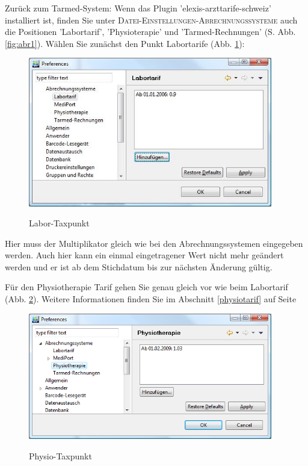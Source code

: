 \documentclass[a4paper]{scrartcl}
\begin{document}
Zurück zum Tarmed-System: Wenn das Plugin 'elexis-arzttarife-schweiz' installiert ist, finden Sie unter \textsc{Datei-Einstellungen-Abrechnungssysteme} auch die Positionen 'Labortarif', 'Physioterapie' und 'Tarmed-Rechnungen' (S. Abb. \ref{fig:abr1}). Wählen Sie zunächst den Punkt Labortarife (Abb. \ref{fig:abr3}):
\begin{figure}
  \includegraphics[width=0.95\textwidth]{abr3}\\
  \caption{Labor-Taxpunkt}\label{fig:abr3}
\end{figure}
Hier muss der Multiplikator gleich wie bei den Abrechnungssystemen eingegeben werden. Auch hier kann ein einmal eingetragener Wert nicht mehr geändert werden und er ist ab dem Stichdatum bis zur nächsten Änderung gültig.

\medskip

Für den Physiotherapie Tarif gehen Sie genau gleich vor wie beim Labortarif (Abb. \ref{fig:abr24}). Weitere Informationen finden Sie im Abschnitt \ref{physiotarif} auf Seite \pageref{physiotarif}
\begin{figure}
  \includegraphics[width=0.95\textwidth]{abr24}\\
  \caption{Physio-Taxpunkt}\label{fig:abr24}
\end{figure}
\end{document}
